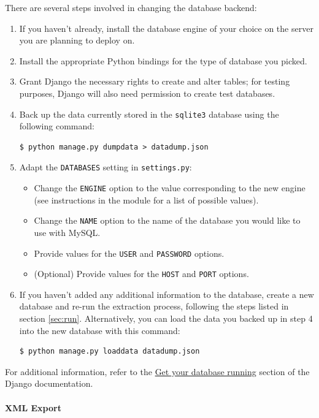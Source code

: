 There are several steps involved in changing the database backend:

\begin{enumerate}
\item If you haven't already, install the database engine of your
  choice on the server you are planning to deploy on.
\item Install the appropriate Python bindings for the type of database
  you picked.
\item Grant Django the necessary rights to create and alter tables;
  for testing purposes, Django will also need permission to create
  test databases.
\item Back up the data currently stored in the \texttt{sqlite3}
  database using the following command:
\begin{verbatim}
$ python manage.py dumpdata > datadump.json
\end{verbatim}
\item Adapt the \texttt{DATABASES} setting in \texttt{settings.py}:
  \begin{itemize}
  \item Change the \texttt{ENGINE} option to the value corresponding
    to the new engine (see instructions in the module for a list of
    possible values).
  \item Change the \texttt{NAME} option to the name of the database
    you would like to use with MySQL.
  \item Provide values for the \texttt{USER} and \texttt{PASSWORD}
    options.
  \item (Optional) Provide values for the \texttt{HOST} and
    \texttt{PORT} options.
  \end{itemize}
\item If you haven't added any additional information to the database,
  create a new database and re-run the extraction process, following
  the steps listed in section \ref{sec:run}. Alternatively, you can
  load the data you backed up in step 4 into the new database with
  this command:
\begin{verbatim}
$ python manage.py loaddata datadump.json
\end{verbatim}
\end{enumerate}

For additional information, refer to the
\href{https://docs.djangoproject.com/en/1.4/topics/install/#database-installation}{Get
your database running} section of the Django documentation.

\paragraph{XML Export}

